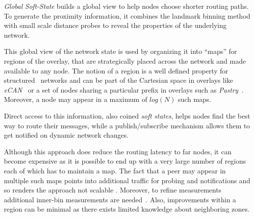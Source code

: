 \emph{Global Soft-State} \cite{XTZ2003} builds a global view to help nodes
choose shorter routing paths. To generate the proximity information, it 
combines the landmark binning method with small
scale distance probes to reveal the properties 
of the underlying network. 

This global view of the network state is used by organizing it into ``maps'' for
regions of the overlay, that are strategically placed
across the network and made available to any node. The notion of a
region is a well defined property for structured \p\ networks and can be part of
the Cartesian space in overlays like \emph{eCAN}~\cite{xu_ecan_2002} or a set of
nodes sharing a particular prefix in overlays such as
\emph{Pastry}~\cite{antony_pastry_2001}. Moreover, a node may appear in a maximum
of $log(N)$ such maps.

Direct access to this information, also coined \emph{soft states}, helps nodes
find the best way to route their messages, while a publish/subscribe mechanism
allows them to get notified on dynamic network changes.

Although this approach does reduce the routing latency to far nodes, it
can become expensive as it is 
possible to end up with a very large number of regions
each of which has to maintain a map. 
The fact that a peer may appear in multiple
such maps points into additional traffic for probing and notifications
and so renders the approach not scalable \cite{RGJZ2004}. 
Moreover, to refine measurements
additional inner-bin measurements are needed~\cite{WZS2004}.
Also, improvements within a region can be minimal as there exists
limited knowledge about neighboring zones.

